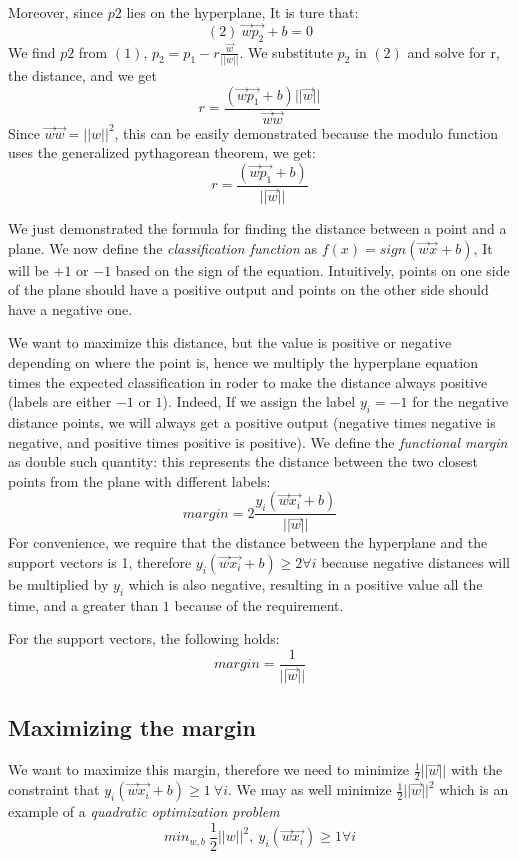 \documentclass[11pt]{article}
\begin{document}
Moreover, since \(p2\) lies on the hyperplane, It is ture that:
\[(2)\ \vec{w}\vec{p_2} + b = 0\] We find \(p2\) from \((1)\),
\(p_2 = p_1 - r\frac{\vec{w}}{||w||}\). We substitute \(p_2\) in \((2)\)
and solve for r, the distance, and we get
\[r = \frac{(\vec{w}\vec{p_1} + b) ||\vec{w}||}{\vec{w}\vec{w}}\] Since
\(\vec{w}\vec{w}=||w||^2\), this can be easily demonstrated because the
modulo function uses the generalized pythagorean theorem, we get:
\[r = \frac{(\vec{w}\vec{p_1} + b)}{||\vec{w}||}\]

We just demonstrated the formula for finding the distance between a
point and a plane. We now define the \emph{classification function} as
\(f(x)= sign(\vec{w}\vec{x} + b)\), It will be \(+1\) or \(-1\) based on
the sign of the equation. Intuitively, points on one side of the plane
should have a positive output and points on the other side should have a
negative one.

We want to maximize this distance, but the value is positive or negative
depending on where the point is, hence we multiply the hyperplane
equation times the expected classification in roder to make the distance
always positive (labels are either \(-1\) or \(1\)). Indeed, If we
assign the label \(y_i=-1\) for the negative distance points, we will
always get a positive output (negative times negative is negative, and
positive times positive is positive). We define the \emph{functional
margin} as double such quantity: this represents the distance between
the two closest points from the plane with different labels:
\[margin = 2\frac{y_i(\vec{w}\vec{x_i}+b)}{||\vec{w}||}\] For
convenience, we require that the distance between the hyperplane and the
support vectors is 1, therefore
\(y_i(\vec{w}\vec{x_i}+b) \ge 2 \forall i\) because negative distances
will be multiplied by \(y_i\) which is also negative, resulting in a
positive value all the time, and a greater than \(1\) because of the
requirement.

For the support vectors, the following holds:
\[margin = \frac{1}{||\vec{w}||}\]

\subsection{Maximizing the margin}\label{maximizing-the-margin}

We want to maximize this margin, therefore we need to minimize
\(\frac{1}{2}||\vec{w}||\) with the constraint that
\(y_i(\vec{w}\vec{x_i}+b) \ge 1\ \forall i\). We may as well minimize
\(\frac{1}{2}||\vec{w}||^2\) which is an example of a \emph{quadratic
optimization problem}
\[ min_{w, b}\ \frac{1}{2} ||w||^2,\ y_i(\vec{w}\vec{x_i}) \ge 1 \forall i \]
\end{document}
